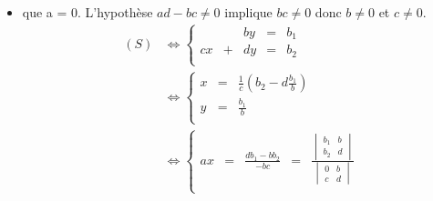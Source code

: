 \documentclass{article}
\begin{document}
\begin{question_kholle}
\begin{itemize}[label=$\bullet$ Supposons]
\begin{itemize}[label=$\bullet$ Supposons]
\begin{equation*}
\begin{aligned}
\begin{array}{ccccc}
                        y  & = & \frac{ab_2 - cb_1}{ad - bc} & = & \frac{\begin{vmatrix}a&b_1\\c&b_2\end{vmatrix}}{\begin{vmatrix}a&b\\c&d\end{vmatrix}} \\
                      \end{array}
                      \right.
                    \end{aligned}
                  \end{equation*}
                  Donc le système admet une unique solution qui est celle annoncée.

            \item que a = 0. L'hypothèse $ad - bc \neq 0$ implique $bc \neq 0$ donc $b \neq 0$ et $c \neq 0$.
                  \begin{equation*}
                    \begin{aligned}
                      (S)
                       & \iff \left\{
                      \begin{array}{ccccc}
                           &   & by & = & b_1 \\
                        cx & + & dy & = & b_2 \\
                      \end{array}
                      \right.         \\
                       & \iff \left\{
                      \begin{array}{ccc}
                        x & = & \frac{1}{c} \left( b_2 - d\frac{b_1}{b} \right) \\
                        y & = & \frac{b_1}{b}                                   \\
                      \end{array}
                      \right.         \\
                       & \iff \left\{
                      \begin{array}{ccccc}
                        ax & = & \frac{db_1 - bb_2}{- bc} & = & \frac{\begin{vmatrix}b_1&b\\b_2&d\end{vmatrix}}{\begin{vmatrix}0&b\\c&d\end{vmatrix}} \\

\end{array}
\end{aligned}
\end{equation*}
\end{itemize}
\end{itemize}
\end{question_kholle}
\end{document}
